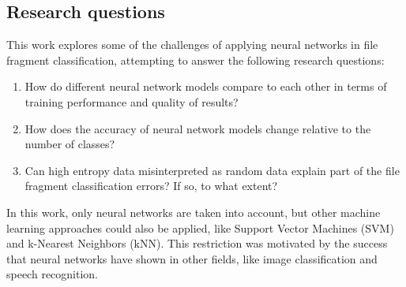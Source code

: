 \subsection{Research questions}
This work explores some of the challenges of applying neural networks in file fragment classification, attempting to answer the following research questions:

\begin{enumerate}[itemindent=\parindent,label=\textbf{Q\arabic*.}]

    \item How do different neural network models compare to each other in terms of training performance and quality of results?
    
    \item How does the accuracy of neural network models change relative to the number of classes?

    \item Can high entropy data misinterpreted as random data explain part of the file fragment classification errors? If so, to what extent?
\end{enumerate}

In this work, only neural networks are taken into account, but other machine learning approaches could also be applied, like Support Vector Machines (SVM) and k-Nearest Neighbors (kNN). This restriction was motivated by the success that neural networks have shown in other fields, like image classification and speech recognition.

